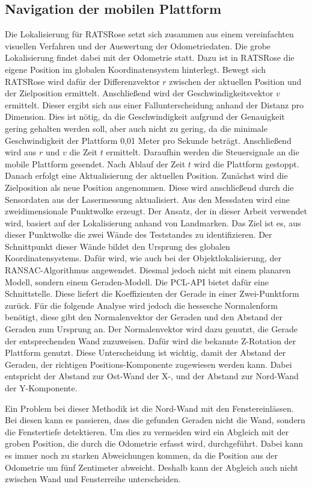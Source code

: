 \subsection{Navigation der mobilen Plattform}
\label{sec:impl-lopo}
Die Lokalisierung für RATSRose setzt sich zusammen aus einem vereinfachten visuellen Verfahren und der Auswertung der Odometriedaten. Die grobe Lokalisierung findet dabei mit der Odometrie statt. Dazu ist in RATSRose die eigene Position im globalen Koordinatensystem hinterlegt. Bewegt sich RATSRose wird dafür der Differenzvektor $r$ zwischen der aktuellen Position und der Zielposition ermittelt. Anschließend wird der Geschwindigkeitsvektor $v$ ermittelt. Dieser ergibt sich aus einer Fallunterscheidung anhand der Distanz pro Dimension. Dies ist nötig, da die Geschwindigkeit aufgrund der Genauigkeit gering gehalten werden soll, aber auch nicht zu gering, da die minimale Geschwindigkeit der Plattform 0,01 Meter pro Sekunde beträgt. Anschließend wird aus $r$ und $v$ die Zeit $t$ ermittelt. Daraufhin werden die Steuersignale an die mobile Plattform gesendet. Nach Ablauf der Zeit $t$ wird die Plattform gestoppt. Danach erfolgt eine Aktualisierung der aktuellen Position. Zunächst wird die Zielposition als neue Position angenommen. Diese wird anschließend durch die Sensordaten aus der Lasermessung aktualisiert. Aus den Messdaten wird eine zweidimensionale Punktwolke erzeugt. Der Ansatz, der in dieser Arbeit verwendet wird, basiert auf der Lokalisierung anhand von Landmarken. Das Ziel ist es, aus dieser Punktwolke die zwei Wände des Teststandes zu identifizieren. Der Schnittpunkt dieser Wände bildet den Ursprung des globalen Koordinatensystems. Dafür wird, wie auch bei der Objektlokalisierung, der RANSAC-Algorithmus angewendet. Diesmal jedoch nicht mit einem planaren Modell, sondern einem Geraden-Modell. Die PCL-API bietet dafür eine Schnittstelle. Diese liefert die Koeffizienten der Gerade in einer Zwei-Punktform zurück. Für die folgende Analyse wird jedoch die hessesche Normalenform benötigt, diese gibt den Normalenvektor der Geraden und den Abstand der Geraden zum Ursprung an. Der Normalenvektor wird dazu genutzt, die Gerade der entsprechenden Wand zuzuweisen. Dafür wird die bekannte Z-Rotation der Plattform genutzt. Diese Unterscheidung ist wichtig, damit der Abstand der Geraden, der richtigen Positions-Komponente zugewiesen werden kann. Dabei entspricht der Abstand zur Ost-Wand der X-, und der Abstand zur Nord-Wand der Y-Komponente.

Ein Problem bei dieser Methodik ist die Nord-Wand mit den Fenstereinlässen. Bei diesen kann es passieren, dass die gefunden Geraden nicht die Wand, sondern die Fenstertiefe detektieren. Um dies zu vermeiden wird ein Abgleich mit der groben Position, die durch die Odometrie erfasst wird, durchgeführt. Dabei kann es immer noch zu starken Abweichungen kommen, da die Position aus der Odometrie um fünf Zentimeter abweicht. Deshalb kann der Abgleich auch nicht zwischen Wand und Fensterreihe unterscheiden.

